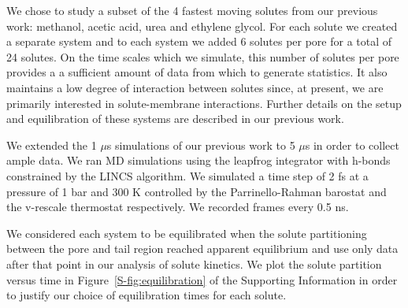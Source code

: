 \documentclass[aps,pre,preprint,groupedaddress]{revtex4-2}
\begin{document}
  
  We chose to study a subset of the 4 fastest moving solutes from our previous
  work: methanol, acetic acid, urea and ethylene glycol. For each solute we 
  created a separate system and to each system we added 6 solutes per pore 
  for a total of 24 solutes. On the time scales which we simulate, this number
  of solutes per pore provides a a sufficient amount of data from which to 
  generate statistics. It also maintains a low degree of interaction between
  solutes since, at present, we are primarily interested in solute-membrane 
  interactions.
  Further details on the setup and equilibration of these systems are described in
  our previous work.\cite{coscia_chemically_2019}
  
  We extended the 1 $\mu$s simulations of our previous work to 5 $\mu$s in order
  to collect ample data. We ran MD simulations using the leapfrog integrator with 
  h-bonds constrained by the LINCS algorithm. We simulated a time step of 2 fs at
  a pressure of 1 bar and 300 K controlled by the Parrinello-Rahman barostat and
  the v-rescale thermostat respectively. We recorded frames every 0.5 ns.
  
  We considered each system to be equilibrated when the solute partitioning between the 
  pore and tail region reached apparent equilibrium and use only data after that point
  in our analysis of solute kinetics. We plot the solute partition versus time in
  Figure~\ref{S-fig:equilibration} of the Supporting Information in order to justify
  our choice of equilibration times for each solute.
\end{document}
